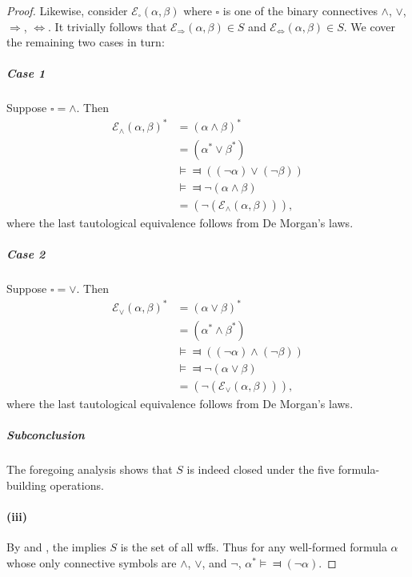 \documentclass{report}
\begin{document}
\begin{proof}
      Likewise, consider $\mathcal{E}_{\square}(\alpha, \beta)$ where $\square$
        is one of the binary connectives $\land$, $\lor$, $\Rightarrow$,
        $\Leftrightarrow$.
      It trivially follows that $\mathcal{E}_{\Rightarrow}(\alpha, \beta) \in S$
        and $\mathcal{E}_{\Leftrightarrow}(\alpha, \beta) \in S$.
      We cover the remaining two cases in turn:

      \subparagraph{Case 1}%

        Suppose $\square = \land$.
        Then
          \begin{align*}
            \mathcal{E}_{\land}(\alpha, \beta)^*
              & = (\alpha \land \beta)^* \\
              & = (\alpha^* \lor \beta^*) \\
              & \vDash\Dashv ((\neg\alpha) \lor (\neg\beta)) \\
              & \vDash\Dashv \neg(\alpha \land \beta) \\
              & = (\neg(\mathcal{E}_{\land}(\alpha, \beta))),
          \end{align*}
          where the last tautological equivalence follows from De Morgan's laws.

      \subparagraph{Case 2}%

        Suppose $\square = \lor$.
        Then
          \begin{align*}
            \mathcal{E}_{\lor}(\alpha, \beta)^*
              & = (\alpha \lor \beta)^* \\
              & = (\alpha^* \land \beta^*) \\
              & \vDash\Dashv ((\neg\alpha) \land (\neg\beta)) \\
              & \vDash\Dashv \neg(\alpha \lor \beta) \\
              & = (\neg(\mathcal{E}_{\lor}(\alpha, \beta))),
          \end{align*}
          where the last tautological equivalence follows from De Morgan's laws.

      \subparagraph{Subconclusion}%

        The foregoing analysis shows that $S$ is indeed closed under the five
          formula-building operations.

    \paragraph{(iii)}%

      By  and ,
        the  implies $S$ is the set of all
        wffs.
      Thus for any well-formed formula $\alpha$ whose only connective symbols
        are $\land$, $\lor$, and $\neg$, $\alpha^* \vDash\Dashv (\neg\alpha)$.

  \end{proof}
\end{document}
